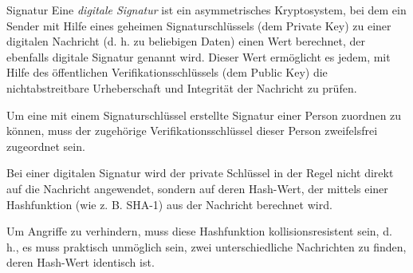 \begin{defi}{Signatur}
    Eine \emph{digitale Signatur} ist ein asymmetrisches Kryptosystem, bei dem ein Sender mit Hilfe eines geheimen Signaturschlüssels (dem Private Key) zu einer digitalen Nachricht (d. h. zu beliebigen Daten) einen Wert berechnet, der ebenfalls digitale Signatur genannt wird.
    Dieser Wert ermöglicht es jedem, mit Hilfe des öffentlichen Verifikationsschlüssels (dem Public Key) die nichtabstreitbare Urheberschaft und Integrität der Nachricht zu prüfen.

    Um eine mit einem Signaturschlüssel erstellte Signatur einer Person zuordnen zu können, muss der zugehörige Verifikationsschlüssel dieser Person zweifelsfrei zugeordnet sein.

    Bei einer digitalen Signatur wird der private Schlüssel in der Regel nicht direkt auf die Nachricht angewendet, sondern auf deren Hash-Wert, der mittels einer Hashfunktion (wie z. B. SHA-1) aus der Nachricht berechnet wird.

    Um Angriffe zu verhindern, muss diese Hashfunktion kollisionsresistent sein, d. h., es muss praktisch unmöglich sein, zwei unterschiedliche Nachrichten zu finden, deren Hash-Wert identisch ist.
\end{defi}

